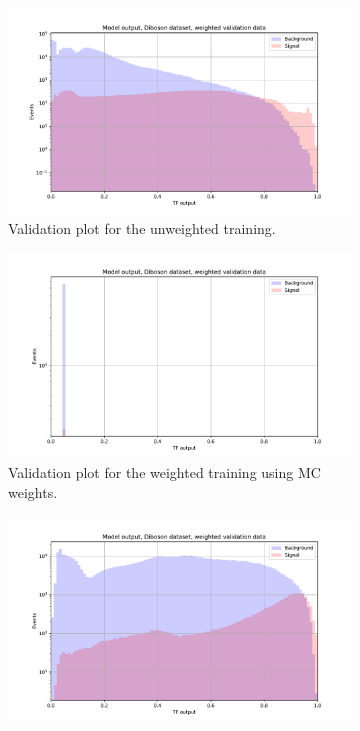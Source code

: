 \documentclass[14pt, a4paper]{book}
\begin{document}
\begin{figure}[!ht]
	\centering
	\begin{subfigure}[b]{0.8\textwidth}
        \centering
        \includegraphics[width=1\textwidth]{VAL_uw.pdf}
        \caption{Validation plot for the unweighted training.}\label{fig:DibosonVALUW}
     \end{subfigure}
     \hfill
     \begin{subfigure}[b]{0.8\textwidth}
        \centering
        \includegraphics[width=1\textwidth]{VAL_mc.pdf}
        \caption{Validation plot for the weighted training using MC weights.}\label{fig:DibosonVALMC}
     \end{subfigure}
     \begin{subfigure}[b]{0.8\textwidth}
        \centering
        \includegraphics[width=1\textwidth]{VAL_w.pdf}

\end{subfigure}
\end{figure}
\end{document}
